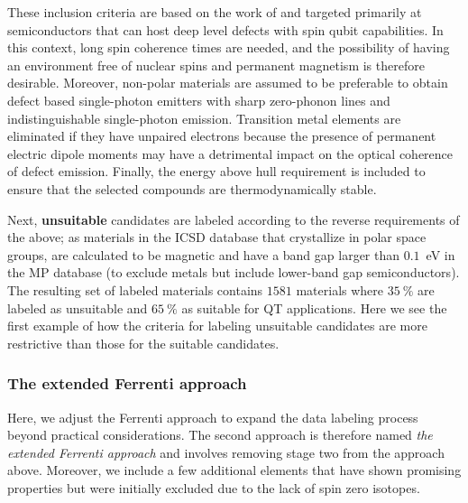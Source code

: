 \documentclass[superscriptaddress,unsortedaddress,
 amsmath,amssymb,
 aps,
]{revtex4-2}
\begin{document}
These inclusion criteria are based on the work of \citeauthor{Weber2010} \cite{Weber2010} and targeted primarily at semiconductors that can host deep level defects with spin qubit capabilities. In this context, long spin coherence times are needed, and the possibility of having an environment free of nuclear spins and permanent magnetism is therefore desirable. 
Moreover, non-polar materials are assumed to be preferable to obtain defect based single-photon emitters with sharp zero-phonon lines and indistinguishable single-photon emission.  
Transition metal elements are eliminated if they have unpaired electrons because the presence of permanent electric dipole moments may have a detrimental impact on the optical coherence of defect emission. 
Finally, the energy above hull requirement is included to ensure that the selected compounds are thermodynamically stable. 

Next, \textbf{unsuitable} candidates are labeled according to the reverse requirements of the above; as materials in the ICSD database \cite{Allen1987,Zagorac2019} 
that crystallize in polar space groups, are calculated to be magnetic and have a band gap larger than $0.1$~eV in the MP database (to exclude metals but include lower-band gap semiconductors). 
The resulting set of labeled materials contains $1581$ materials where $35 \ \%$
are labeled as unsuitable and 
$65 \ \%$ as suitable for QT applications.
Here we see the first example of how the criteria for labeling unsuitable candidates are more restrictive than those for the suitable candidates.


\subsubsection*{The extended Ferrenti approach}
Here, we adjust the Ferrenti approach to expand the data labeling process beyond practical  considerations. The second approach is therefore named \emph{the extended Ferrenti approach} and involves removing stage two from the approach above. Moreover, we include a few additional elements that have shown promising properties but were initially excluded due to the lack of spin zero isotopes. 
\end{document}
